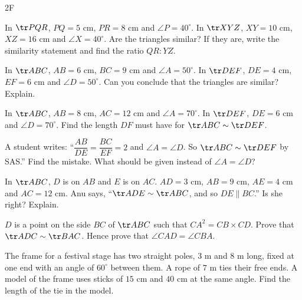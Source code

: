\begin{exercise}{2F}
  \item In $\tr PQR$, $PQ=5$ cm, $PR=8$ cm and $\angle P=40^\circ$. In $\tr XYZ$, $XY=10$ cm, $XZ=16$ cm and $\angle X=40^\circ$. Are the triangles similar? If they are, write the similarity statement and find the ratio $QR:YZ$.
  \item In $\tr ABC$, $AB=6$ cm, $BC=9$ cm and $\angle A=50^\circ$. In $\tr DEF$, $DE=4$ cm, $EF=6$ cm and $\angle D=50^\circ$. Can you conclude that the triangles are similar? Explain.
  \item In $\tr ABC$, $AB=8$ cm, $AC=12$ cm and $\angle A=70^\circ$. In $\tr DEF$, $DE=6$ cm and $\angle D=70^\circ$. Find the length $DF$ must have for $\tr ABC\sim\tr DEF$.
  \item A student writes: ``$\dfrac{AB}{DE}=\dfrac{BC}{EF}=2$ and $\angle A=\angle D$. So $\tr ABC\sim\tr DEF$ by SAS.'' Find the mistake. What should be given instead of $\angle A=\angle D$?
  \item In $\tr ABC$, $D$ is on $AB$ and $E$ is on $AC$. $AD=3$ cm, $AB=9$ cm, $AE=4$ cm and $AC=12$ cm. Anu says, ``$\tr ADE\sim\tr ABC$, and so $DE\parallel BC$.'' Is she right? Explain.
  \item $D$ is a point on the side $BC$ of $\tr ABC$ such that $CA^2=CB\times CD$. Prove that $\tr ADC\sim\tr BAC$. Hence prove that $\angle CAD=\angle CBA$.
\begin{center}\end{center}
  \item The frame for a festival stage has two straight poles, $3$ m and $8$ m long, fixed at one end with an angle of $60^\circ$ between them. A rope of $7$ m ties their free ends. A model of the frame uses sticks of $15$ cm and $40$ cm at the same angle. Find the length of the tie in the model.
\end{exercise}

